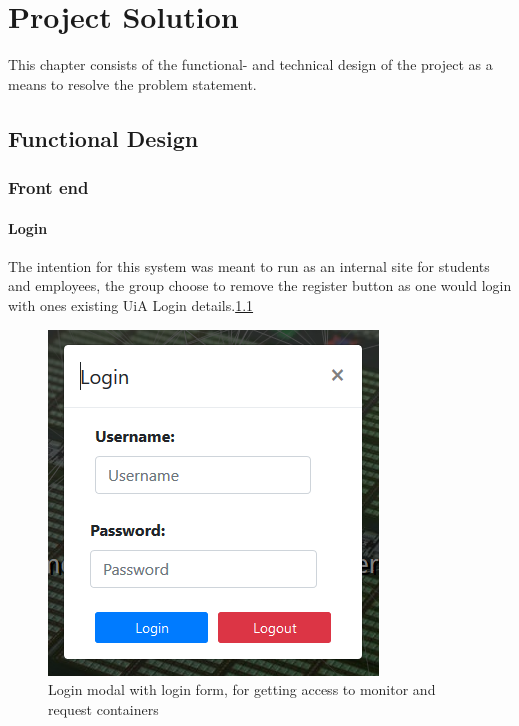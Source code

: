 \documentclass[../main.tex]{subfiles}
\begin{document}
\renewcommand{\baselinestretch}{1.5}
\chapter{Project Solution}
This chapter consists of the functional- and technical design of the project as a means to resolve the problem statement.

\section{Functional Design}
\subsection{Front end}
\subsubsection*{Login}

The intention for this system was meant to run as an internal site for students and employees, the group choose to remove the register button as one would login with ones existing UiA Login details.\ref{fig:portal_login}
\begin{figure}[H]
    \centering
    \includegraphics[scale=.7]{img/frontend/portal_login.png}
    \caption{Login modal with login form, for getting access to monitor and request containers}
    \label{fig:portal_login}
\end{figure}
\end{document}
